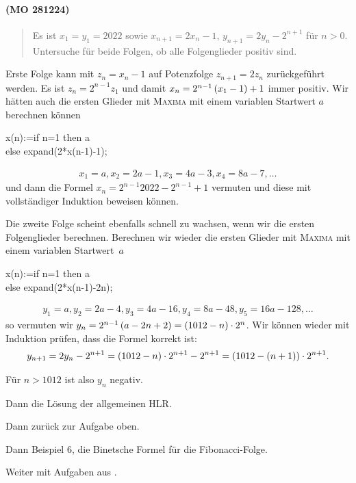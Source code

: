 \documentclass[11pt,a4paper]{article}
\newcommand{\cas}[1]{\textsc{#1}}
\begin{document}
\paragraph{(MO 281224)}
\begin{quote}
  Es ist $x_1=y_1=2022$ sowie $x_{n+1}=2x_n-1$, $y_{n+1}=2y_n-2^{n+1}$ für
  $n>0$.  Untersuche für beide Folgen, ob alle Folgenglieder positiv sind.
\end{quote}
\begin{loesung}
  Erste Folge kann mit $z_n=x_n-1$ auf Potenzfolge $z_{n+1}=2z_n$
  zurückgeführt werden. Es ist $z_n=2^{n-1}z_1$ und damit
  $x_n=2^{n-1}\left(x_1-1\right)+1$ immer positiv.  Wir hätten auch die ersten Glieder
  mit \cas{Maxima} mit einem variablen Startwert $a$ berechnen können
  \begin{code}
    x(n):=if n=1 then a\\
    else expand(2*x(n-1)-1);
  \end{code}
  \begin{gather*}
    x_1=a, x_2=2a-1, x_3=4a-3, x_4=8a-7, \dots
  \end{gather*}
  und dann die Formel $x_n=2^{n-1}2022-2^{n-1}+1$ vermuten und diese mit
  vollständiger Induktion beweisen können. 

  Die zweite Folge scheint ebenfalls schnell zu wachsen, wenn wir die ersten
  Folgenglieder berechnen.  Berechnen wir wieder die ersten Glieder mit
  \cas{Maxima} mit einem variablen Startwert~$a$ 
  \begin{code}
    x(n):=if n=1 then a\\
    else expand(2*x(n-1)-2\pw n);
  \end{code}
  \begin{gather*}
    y_1=a, y_2=2a-4, y_3=4a-16, y_4=8a-48, y_5=16a-128,\dots
  \end{gather*}
  so vermuten wir $y_n=2^{n-1}\left(a-2n+2\right)=(1012-n)\cdot 2^n$.   Wir können wieder
  mit Induktion prüfen, dass die Formel korrekt ist:
  \begin{gather*}
    y_{n+1}=2y_n-2^{n+1}=(1012-n)\cdot2^{n+1}-2^{n+1}=(1012-(n+1))\cdot2^{n+1}.
  \end{gather*}
\end{loesung}
Für $n>1012$ ist also $y_n$ negativ.

Dann die Lösung der allgemeinen HLR.

Dann zurück zur Aufgabe oben. 

Dann Beispiel 6, die Binetsche Formel für die Fibonacci-Folge.

Weiter mit Aufgaben aus \cite{S}.
\end{document}
